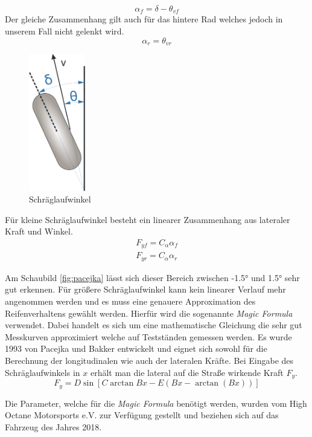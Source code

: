 \documentclass{like}
\begin{document}
\begin{equation}
\alpha_f = \delta - \theta_{vf}
\end{equation}
Der gleiche Zusammenhang gilt auch für das hintere Rad welches jedoch in unserem Fall nicht gelenkt wird.
\begin{equation}
\alpha_r = \theta_{vr}
\end{equation}


\begin{figure}[ht!]
	\centering
	\includegraphics[width=70pt]{Abbildungen/slipAngle.png}
	\caption{Schräglaufwinkel}
	\label{fig:linLat}
\end{figure}


Für kleine Schräglaufwinkel besteht ein linearer Zusammenhang aus lateraler Kraft und Winkel. 
\begin{eqnarray}
F_{yf} = C_\alpha \alpha_f \\
F_{yr} = C_\alpha \alpha_r
\end{eqnarray}

Am Schaubild \ref{fig:pacejka} lässt sich dieser Bereich zwischen -1.5° und 1.5° sehr gut erkennen. Für größere Schräglaufwinkel kann kein linearer Verlauf mehr angenommen werden und es muss eine genauere Approximation des Reifenverhaltens gewählt werden. Hierfür wird die sogenannte \textit{Magic Formula}  \cite{magicFormula} verwendet. Dabei handelt es sich um eine mathematische Gleichung die sehr gut Messkurven approximiert welche auf Testständen gemessen werden.
Es wurde 1993 von Pacejka und Bakker entwickelt und eignet sich sowohl für die Berechnung der longitudinalen wie auch der lateralen Kräfte. Bei Eingabe des Schräglaufwinkels in \(x\) erhält man die lateral auf die Straße wirkende Kraft \(F_y\). 
\begin{equation}
F_y = D\sin[C\arctan{Bx - E(Bx - \arctan(Bx))}]
\label{eq:magicF}
\end{equation}

Die Parameter, welche für die \textit{Magic Formula} benötigt werden, wurden vom High Octane Motorsports e.V. zur Verfügung gestellt und beziehen sich auf das Fahrzeug des Jahres 2018.
\end{document}
